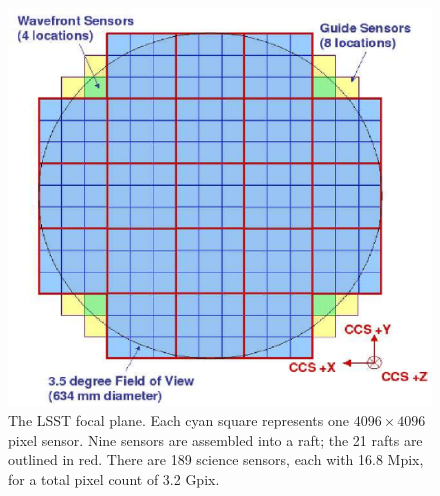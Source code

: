 \documentclass{emulateapj}
\begin{document}
\begin{figure}[ht]
\includegraphics[width=1.0\hsize,clip]{fov.ps}
\caption{The LSST focal plane. Each cyan square represents one
$4096\times4096$ pixel sensor. Nine sensors are assembled into a
raft; the 21 rafts are outlined in red. There are 189 science sensors, each 
with 16.8 Mpix, for a total pixel count of 3.2 Gpix.} 
\label{Fig:fov}
\end{figure}
\end{document}
